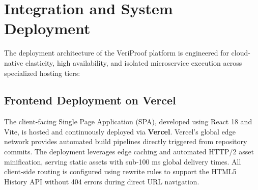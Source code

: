 




\section{Integration and System Deployment}
The deployment architecture of the VeriProof platform is engineered for cloud-native elasticity, high availability, and isolated microservice execution across specialized hosting tiers:

\subsection{Frontend Deployment on Vercel}
The client-facing Single Page Application (SPA), developed using React 18 and Vite, is hosted and continuously deployed via \textbf{Vercel}. Vercel's global edge network provides automated build pipelines directly triggered from repository commits. The deployment leverages edge caching and automated HTTP/2 asset minification, serving static assets with sub-100 ms global delivery times. All client-side routing is configured using rewrite rules to support the HTML5 History API without 404 errors during direct URL navigation.

